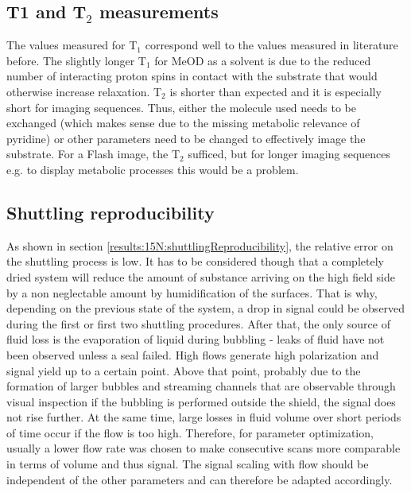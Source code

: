         \subsection{T1 and T$_2$ measurements}
        The values measured for T$_1$ correspond well to the values measured in literature before. The slightly longer T$_1$ for MeOD as a solvent is due to the reduced number of interacting proton spins in contact with the substrate that would otherwise increase relaxation. T$_2$ is shorter than expected and it is especially short for imaging sequences. Thus, either the molecule used needs to be exchanged (which makes sense due to the missing metabolic relevance of pyridine) or other parameters need to be changed to effectively image the substrate. For a Flash image, the T$_2$ sufficed, but for longer imaging sequences e.g. to display  metabolic processes this would be a problem.
        \subsection{Shuttling reproducibility}
            As shown in section \ref{results:15N:shuttlingReproducibility}, the relative error on the shuttling process is low. It has to be considered though that a completely dried system will reduce the amount of substance arriving on the high field side by a non neglectable amount by humidification of the surfaces. That is why, depending on the previous state of the system, a drop in signal could be observed during the first or first two shuttling procedures. After that, the only source of fluid loss is the evaporation of liquid during bubbling - leaks of fluid have not been observed unless a seal failed. High flows generate high polarization  and signal yield up to a certain point. Above that point, probably due to the formation of larger bubbles and streaming channels that are observable through visual inspection if the bubbling is performed outside the shield, the signal does not rise further. At the same time, large losses in fluid volume over short periods of time occur if the flow is too high. Therefore, for parameter optimization, usually  a lower flow rate was chosen to make consecutive scans more comparable in terms of volume and thus signal. The signal scaling with flow should be independent of the other parameters and can therefore be adapted accordingly.
